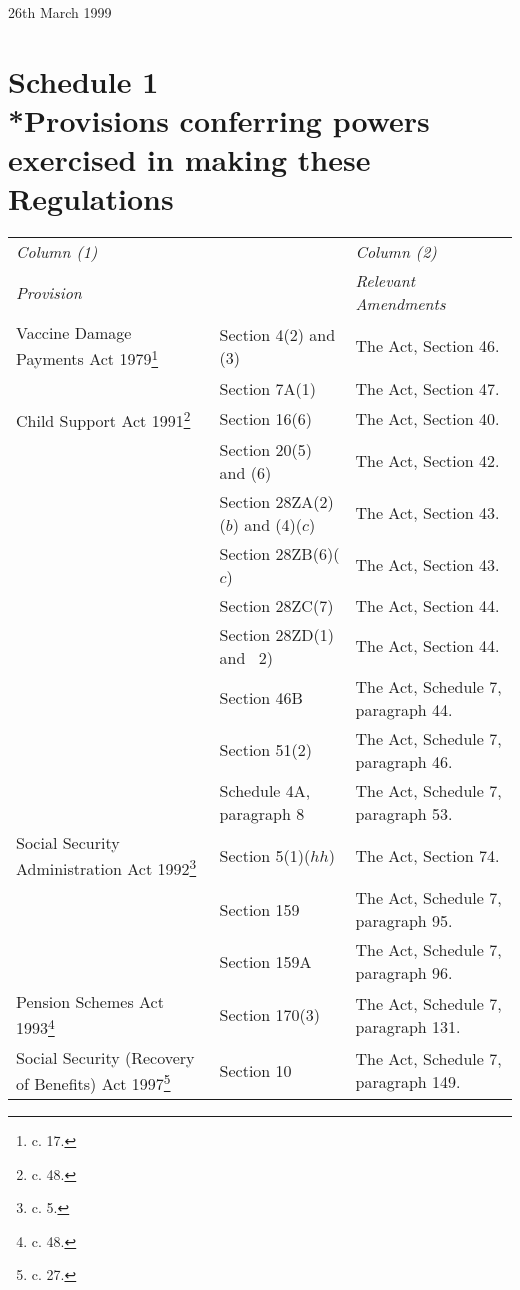 \documentclass[12pt,a4paper]{article}
\begin{document}
26th March 1999

\small

\part[Schedule 1 --- Provisions conferring powers exercised in making these Regulations]{Schedule 1\\*Provisions conferring powers exercised in making these Regulations}

\renewcommand\parthead{--- Schedule 1}

{\footnotesize{}
\begin{longtable}{p{150pt}p{102pt}p{102pt}}
\hline
\itshape Column (1) & & \itshape Column (2)\\
\itshape Provision & & \itshape Relevant Amendments\\
\hline
\endhead
\hline
\endlastfoot
Vaccine Damage Payments Act 1979\footnote{\frenchspacing 1979 c. 17.}&Section 4(2) and (3)&The Act, Section 46.\\
&Section 7A(1)&The Act, Section 47.\\
Child Support Act 1991\footnote{\frenchspacing 1991 c. 48.}&Section 16(6)&The Act, Section 40.\\
&Section 20(5) and (6)&The Act, Section 42.\\
&Section 28ZA(2)($b$) and (4)($c$)&The Act, Section 43.\\
&Section 28ZB(6)($c$)&The Act, Section 43.\\
&Section 28ZC(7)&The Act, Section 44.\\
&Section 28ZD(1) and~ 2)&The Act, Section 44.\\
&Section 46B&The Act, Schedule 7, paragraph 44.\\
&Section 51(2)&The Act, Schedule 7, paragraph 46.\\
&Schedule 4A, paragraph 8&The Act, Schedule 7, paragraph 53.\\
Social Security Administration Act 1992\footnote{\frenchspacing 1992 c. 5.}&Section 5(1)($hh$)&The Act, Section 74.\\
&Section 159&The Act, Schedule 7, paragraph 95.\\
&Section 159A&The Act, Schedule 7, paragraph 96.\\
Pension Schemes Act 1993\footnote{\frenchspacing 1993 c. 48.}&Section 170(3)&The Act, Schedule 7, paragraph 131.\\
Social Security (Recovery of Benefits) Act 1997\footnote{\frenchspacing 1997 c. 27.}&Section 10&The Act, Schedule 7, paragraph 149.\\

\end{longtable}}
\end{document}
